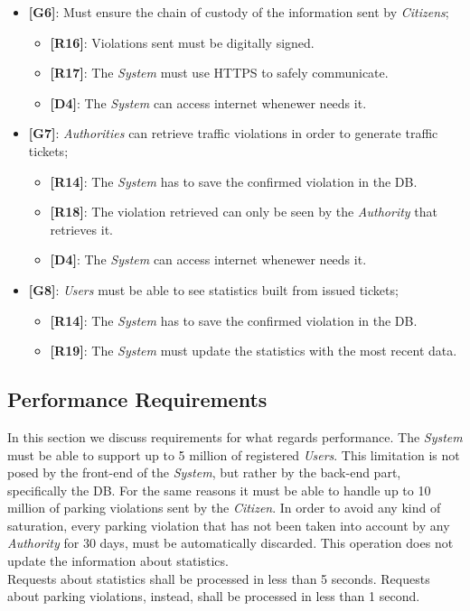 \documentclass{article}
\begin{document}
\begin{itemize}
    \item \textbf{[G6]}: Must ensure the chain of custody of the information sent by \textit{Citizens};
    \begin{itemize}
        \item \textbf{[R16]}: Violations sent must be digitally signed.
        \item \textbf{[R17]}: The \textit{System} must use HTTPS to safely communicate.
        \item \textbf{[D4]}: The \textit{System} can access internet whenewer needs it.
    \end{itemize}

    \item \textbf{[G7]}: \textit{Authorities} can retrieve traffic violations in order to generate traffic tickets;
    \begin{itemize}
        \item \textbf{[R14]}: The \textit{System} has to save the confirmed violation in the DB.
        \item \textbf{[R18]}: The violation retrieved can only be seen by the \textit{Authority} that retrieves it.
        \item \textbf{[D4]}: The \textit{System} can access internet whenewer needs it.
    \end{itemize}

    \item \textbf{[G8]}: \textit{Users} must be able to see statistics built from issued tickets;
    \begin{itemize}
        \item \textbf{[R14]}: The \textit{System} has to save the confirmed violation in the DB.
        \item \textbf{[R19]}: The \textit{System} must update the statistics with the most recent data.
    \end{itemize}
\end{itemize}

\subsection{Performance Requirements}
In this section we discuss requirements for what regards performance. The \textit{System} must be able to support up to
5 million of registered \textit{Users}. This limitation is not posed by the front-end of the \textit{System}, but rather by the 
back-end part, specifically the DB. For the same reasons it must be able to handle up to 10 million of parking violations 
sent by the \textit{Citizen}. In order to avoid any kind of saturation, every parking violation that has not been taken into account
by any \textit{Authority} for 30 days, must be automatically discarded. This operation does not update the information about 
statistics.
 \\Requests about statistics shall be processed in less than 5 seconds. Requests about parking violations, instead, shall be processed 
 in less than 1 second.     
\end{document}
